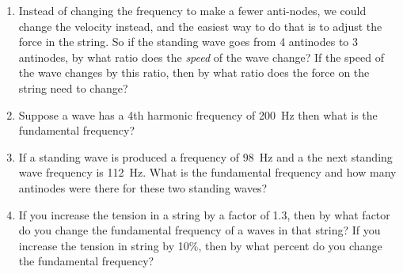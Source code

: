 \begin{enumerate}
	\item
	Instead of changing the frequency to make a fewer anti-nodes, we could change the velocity instead, and the easiest way to do that is to adjust the force in the string. So if the standing wave goes from 4 antinodes to 3 antinodes, by what ratio does the \emph{speed} of the wave change? If the speed of the wave changes by this ratio, then by what ratio does the force on the string need to change? 
	
	\item
	Suppose a wave has a 4th harmonic frequency of \SI{200}{\hertz} then what is the fundamental frequency? 
	
	\item
	If a standing wave is produced a frequency of \SI{98}{\hertz} and a the next standing wave frequency is \SI{112}{\hertz}. What is the fundamental frequency and how many antinodes were there for these two standing waves?
	
	\item
	If you increase the tension in a string by a factor of 1.3, then by what factor do you change the fundamental frequency of a waves in that string? If you increase the tension in string by 10\%, then by what percent do you change the fundamental frequency?   
	
	

	
\end{enumerate}